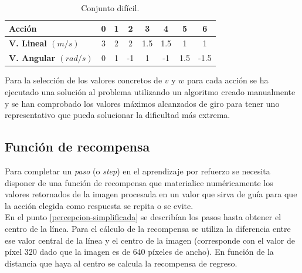 \begin{table}[ht!]
\centering
\begin{tabular}{|l|c|c|c|c|c|c|c|}
\hline
\rowcolor[HTML]{EFEFEF} 
\textbf{Acción}                                       & \textbf{0} & \textbf{1} & \textbf{2} & \textbf{3} & \textbf{4} & \textbf{5} & \textbf{6} \\ \hline
\cellcolor[HTML]{EFEFEF}\textbf{V. Lineal $(m/s)$}    & 3          & 2          & 2          & 1.5        & 1.5        & 1          & 1          \\ \hline
\cellcolor[HTML]{EFEFEF}\textbf{V. Angular $(rad/s)$} & 0          & 1          & -1         & 1          & -1         & 1.5        &  -1.5          \\ \hline
\end{tabular}
\caption{Conjunto difícil.}\label{conjunto-3}
\end{table}

Para la selección de los valores concretos de $v$ y $w$ para cada acción se ha ejecutado una solución al problema utilizando un algoritmo creado manualmente y se han comprobado los valores máximos alcanzados de giro para tener uno representativo que pueda solucionar la dificultad más extrema.



\subsection{Función de recompensa}\label{funcion-recompensa}

Para completar un \textit{paso} (o \textit{step}) en el aprendizaje por refuerzo se necesita disponer de una función de recompensa que materialice numéricamente los valores retornados de la imagen procesada en un valor que sirva de guía para que la acción elegida como respuesta se repita o se evite.\\

En el punto \ref{percepcion-simplificada} se describían los pasos hasta obtener el centro de la línea. Para el cálculo de la recompensa se utiliza la diferencia entre ese valor central de la línea y el centro de la imagen (corresponde con el valor de píxel $320$ dado que la imagen es de $640$ píxeles de ancho). En función de la distancia que haya al centro se calcula la recompensa de regreso.\\


